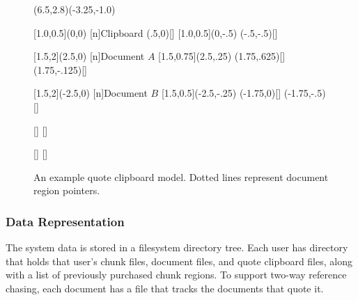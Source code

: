 \documentclass{acm_proc_article-sp}
\begin{document}
\begin{figure}[b]
\begin{center}

\begin{graph}(6.5,2.8)(-3.25,-1.0)
\opaquetextfalse


[1.0,0.5](0,0)
[n]{Clipboard}
(.5,0)[]
[1.0,0.5](0,-.5)
(-.5,-.5)[]


[1.5,2](2.5,0)     
[n]{Document $A$}
[1.5,0.75](2.5,.25)  
(1.75,.625)[]
(1.75,-.125)[]


[1.5,2](-2.5,0)     
[n]{Document $B$}
[1.5,0.5](-2.5,-.25)  
(-1.75,0)[]
(-1.75,-.5)[]



[]
[]

[]
[]

\end{graph}

\caption{An example quote clipboard model.  Dotted lines represent document region pointers.}
\label{fig:quoteClipboardModel}

\end{center}

\end{figure}






\subsubsection{Data Representation}
The system data is stored in a filesystem directory tree.
Each user has directory that holds that user's chunk files, document files, and quote clipboard files, along with a list of previously purchased chunk regions.
To support two-way reference chasing, each document has a file that tracks the documents that quote it.
\end{document}
